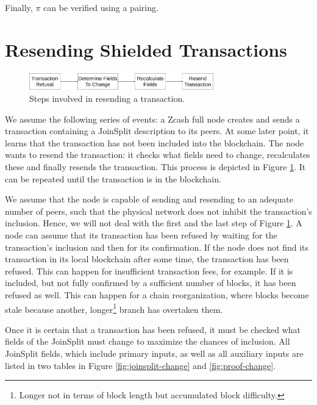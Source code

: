 \documentclass{article}
\begin{document}
Finally, $\pi$ can be verified using a pairing.

\section{Resending Shielded Transactions}

\begin{figure}[t]
\includegraphics[width=8cm]{images/timeline.png}
\caption{Steps involved in resending a transaction.} \label{fig:resend-steps}
\centering
\end{figure}

We assume the following series of events: a Zcash full node creates and sends a transaction containing a JoinSplit description to its peers.
At some later point, it learns that the transaction has not been included into the blockchain.
The node wants to resend the transaction: it checks what fields need to change, recalculates these and finally resends the transaction.
This process is depicted in Figure \ref{fig:resend-steps}.
It can be repeated until the transaction is in the blockchain.

We assume that the node is capable of sending and resending to an adequate number of peers, such that the physical network does not inhibit the transaction's inclusion.
Hence, we will not deal with the first and the last step of Figure \ref{fig:resend-steps}.
A node can assume that its transaction has been refused by waiting for the transaction's inclusion and then for its confirmation.
If the node does not find its transaction in its local blockchain after some time, the transaction has been refused.
This can happen for insufficient transaction fees, for example.
If it is included, but not fully confirmed by a sufficient number of blocks, it has been refused as well.
This can happen for a chain reorganization, where blocks become stale because another, longer\footnote{Longer not in terms of block length but accumulated block difficulty.} branch has overtaken them.

Once it is certain that a transaction has been refused, it must be checked what fields of the JoinSplit must change to maximize the chances of inclusion.
All JoinSplit fields, which include primary inputs, as well as all auxiliary inputs are listed in two tables in Figure \ref{fig:joinsplit-change} and \ref{fig:proof-change}.
\end{document}
